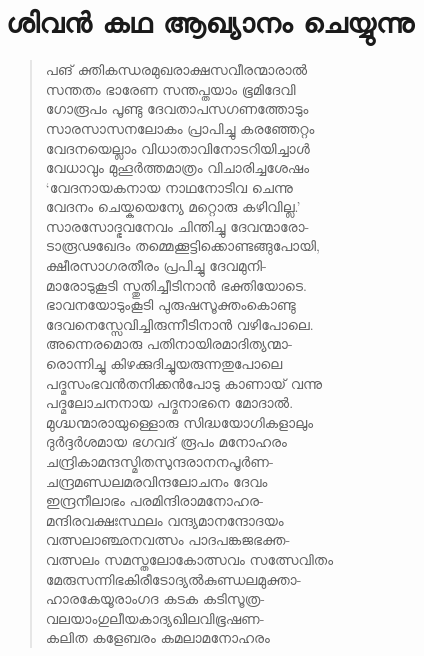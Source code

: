 \section{ശിവന്‍ കഥ ആഖ്യാനം ചെയ്യുന്നു}

\begin{verse}
പങ് ക്തികന്ധരമുഖരാക്ഷസവീരന്മാരാല്‍\\
സന്തതം ഭാരേണ സന്തപ്തയാം ഭൂമിദേവി\\
ഗോരൂപം പൂണ്ടു ദേവതാപസഗണത്തോടും\\
സാരസാസനലോകം പ്രാപിച്ചു കരഞ്ഞേറ്റം\\
വേദനയെല്ലാം വിധാതാവിനോടറിയിച്ചാള്‍\\
വേധാവും മുഹൂര്‍ത്തമാത്രം വിചാരിച്ചശേഷം\\
‘വേദനായകനായ നാഥനോടിവ ചെന്നു\\
വേദനം ചെയ്കയെന്യേ മറ്റൊരു കഴിവില്ല.’\\
സാരസോദ്ഭവനേവം ചിന്തിച്ചു ദേവന്മാരോ-\\
ടാരൂഢഖേദം തമ്മെക്കൂട്ടിക്കൊണ്ടങ്ങുപോയി,\\
ക്ഷീരസാഗരതീരം പ്രപിച്ചു ദേവമുനി-\\
മാരോടുകൂടി സ്തുതിച്ചീടിനാന്‍ ഭക്തിയോടെ.\\
ഭാവനയോടുംകൂടി പുരുഷസൂക്തംകൊണ്ടു\\
ദേവനെസ്സേവിച്ചിരുന്നീടിനാന്‍ വഴിപോലെ.\\
അന്നെരമൊരു പതിനായിരമാദിത്യന്മാ-\\
രൊന്നിച്ചു കിഴക്കുദിച്ചുയരുന്നതുപോലെ\\
പദ്മസംഭവന്‍തനിക്കന്‍പോടു കാണായ് വന്നു\\
പദ്മലോചനനായ പദ്മനാഭനെ മോദാല്‍.\\
മുഗ്ദ്ധന്മാരായുള്ളൊരു സിദ്ധയോഗികളാലും\\
ദുര്‍ദ്ദര്‍ശമായ ഭഗവദ് രൂപം മനോഹരം\\
ചന്ദ്രികാമന്ദസ്മിതസുന്ദരാനനപൂര്‍ണ-\\
ചന്ദ്രമണ്ഡലമരവിന്ദലോചനം ദേവം\\
ഇന്ദ്രനീലാഭം പരമിന്ദിരാമനോഹര-\\
മന്ദിരവക്ഷഃസ്ഥലം വന്ദ്യമാനന്ദോദയം\\
വത്സലാഞ്ഛനവത്സം പാദപങ്കജഭക്ത-\\
വത്സലം സമസ്തലോകോത്സവം സത്സേവിതം\\
മേരുസന്നിഭകിരീടോദ്യല്‍കുണ്ഡലമുക്താ-\\
ഹാരകേയൂരാംഗദ കടക കടിസൂത്ര-\\
വലയാംഗുലീയകാദ്യഖിലവിഭൂഷണ-\\
കലിത കളേബരം കമലാമനോഹരം\\

\end{verse}
